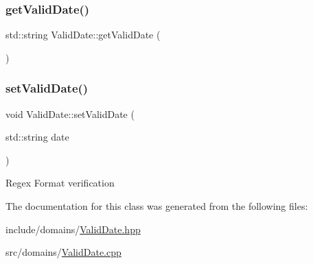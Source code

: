 \subsubsection{\texorpdfstring{getValidDate()}{getValidDate()}}
{\footnotesize\ttfamily std\+::string Valid\+Date\+::get\+Valid\+Date (\begin{DoxyParamCaption}{ }\end{DoxyParamCaption})}

\mbox{\label{class_valid_date_a28905a1bdaa71556225b7e565735364c}} 
\subsubsection{\texorpdfstring{setValidDate()}{setValidDate()}}
{\footnotesize\ttfamily void Valid\+Date\+::set\+Valid\+Date (\begin{DoxyParamCaption}\item[{std\+::string}]{date }\end{DoxyParamCaption})}

Regex Format verification 

The documentation for this class was generated from the following files\+:\begin{DoxyCompactItemize}
\item 
include/domains/\mbox{\hyperlink{_valid_date_8hpp}{Valid\+Date.\+hpp}}\item 
src/domains/\mbox{\hyperlink{_valid_date_8cpp}{Valid\+Date.\+cpp}}\end{DoxyCompactItemize}
